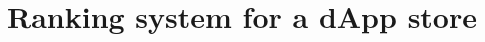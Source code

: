 \documentclass[12pt, a4paper, twoside, titlepage]{article}
\date{\today}
\begin{document}

\tableofcontents

\part{Ranking system for a dApp store}

 
 
 
\end{document}
